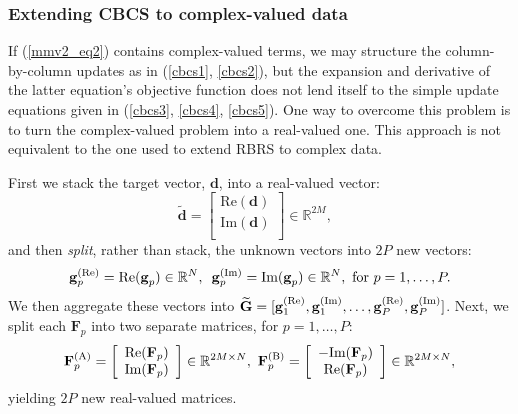 \documentclass[final]{siamltex}
\newcommand{\field}[1]{\mathbb{#1}}
\newcommand{\la}[1]{\mbox{$\mathbf{#1}$}}  \newcommand{\sst}[1]{\mbox{\scriptsize{#1}}}
\begin{document}
    \subsubsection{Extending CBCS to complex-valued data} If
    (\ref{mmv2_eq2}) contains complex-valued terms, we may structure
    the column-by-column updates as in (\ref{cbcs1}, \ref{cbcs2}),
    but the expansion and derivative of the latter equation's
    objective function does not lend itself to the simple update
    equations given in (\ref{cbcs3}, \ref{cbcs4}, \ref{cbcs5}).  One
    way to overcome this problem is to turn the complex-valued problem
    into a real-valued one.  This approach is not equivalent to the
    one used to extend RBRS to complex data.

    First we stack the target vector, \la{d}, into a real-valued vector:
    \begin{equation}\label{cbcs_comp1}
     \widetilde{\la{d}}   = \left [  \begin{array}{c}
                                     \mbox{Re}(\la{d}) \\ 
                                     \mbox{Im}(\la{d}) \\
                                     \end{array} \right ] \in \field{R}^{2M}, \mbox{ }
    \end{equation}
    and then {\em{split}}, rather than stack, the unknown vectors into $2P$ new vectors:
    \begin{equation}\label{cbcs_comp2}
       \la{g}_p^{\sst{(Re)}} = \mbox{Re}(\la{g}_p) \in \field{R}^{N}, \,\,\,
       \la{g}_p^{\sst{(Im)}} = \mbox{Im}(\la{g}_p) \in \field{R}^{N}, \mbox{ for } p = 1, \ldots, P.
   \end{equation}
   We then aggregate these vectors into $\widetilde{\la{G}} =
   [\la{g}_1^{\sst{(Re)}}, \la{g}_1^{\sst{(Im)}}, \ldots,
   \la{g}_P^{\sst{(Re)}}, \la{g}_P^{\sst{(Im)}}]$. Next, we split each
   $\la{F}_p$ into two separate matrices, for $p = 1, \ldots, P$:
   \begin{equation}\label{cbcs_comp3}
      \la{F}_p^{\sst{(A)}} = \left[ \begin{array}{c}
                             \mbox{Re}(\la{F}_p) \\
                             \mbox{Im}(\la{F}_p) \\
                             \end{array} \right ] \in \field{R}^{2M \times N}, \mbox{ }
      \la{F}_p^{\sst{(B)}} = \left[ \begin{array}{c}
                             -\mbox{Im}(\la{F}_p) \\
                              \mbox{Re}(\la{F}_p) \\
                            \end{array} \right ] \in \field{R}^{2M \times N},
   \end{equation}
   yielding $2P$ new real-valued matrices.
\end{document}
